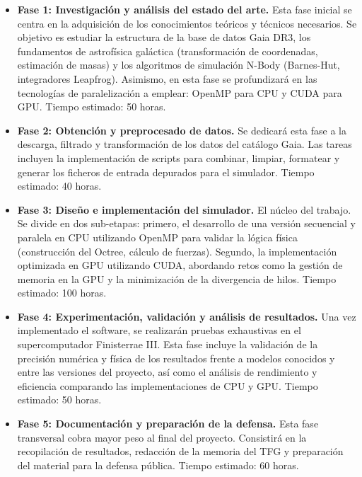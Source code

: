 \begin{itemize}
    \item \textbf{Fase 1: Investigación y análisis del estado del arte.} Esta fase inicial se centra en la adquisición de los conocimientos teóricos y técnicos necesarios. Se objetivo es estudiar la estructura de la base de datos Gaia DR3, los fundamentos de astrofísica galáctica (transformación de coordenadas, estimación de masas) y los algoritmos de simulación N-Body (Barnes-Hut, integradores Leapfrog). Asimismo, en esta fase se profundizará en las tecnologías de paralelización a emplear: OpenMP para CPU y CUDA para GPU. Tiempo estimado: 50 horas.

    \item \textbf{Fase 2: Obtención y preprocesado de datos.} Se dedicará esta fase a la descarga, filtrado y transformación de los datos del catálogo Gaia. Las tareas incluyen la implementación de scripts para combinar, limpiar, formatear y generar los ficheros de entrada depurados para el simulador. Tiempo estimado: 40 horas.

    \item \textbf{Fase 3: Diseño e implementación del simulador.} El núcleo del trabajo. Se divide en dos sub-etapas: primero, el desarrollo de una versión secuencial y paralela en CPU utilizando OpenMP para validar la lógica física (construcción del Octree, cálculo de fuerzas). Segundo, la implementación optimizada en GPU utilizando CUDA, abordando retos como la gestión de memoria en la GPU y la minimización de la divergencia de hilos. Tiempo estimado: 100 horas.

    \item \textbf{Fase 4: Experimentación, validación y análisis de resultados.} Una vez implementado el software, se realizarán pruebas exhaustivas en el supercomputador Finisterrae III. Esta fase incluye la validación de la precisión numérica y física de los resultados frente a modelos conocidos y entre las versiones del proyecto, así como el análisis de rendimiento y eficiencia comparando las implementaciones de CPU y GPU. Tiempo estimado: 50 horas.

    \item \textbf{Fase 5: Documentación y preparación de la defensa.} Esta fase transversal cobra mayor peso al final del proyecto. Consistirá en la recopilación de resultados, redacción de la memoria del TFG y preparación del material para la defensa pública. Tiempo estimado: 60 horas.
\end{itemize}

